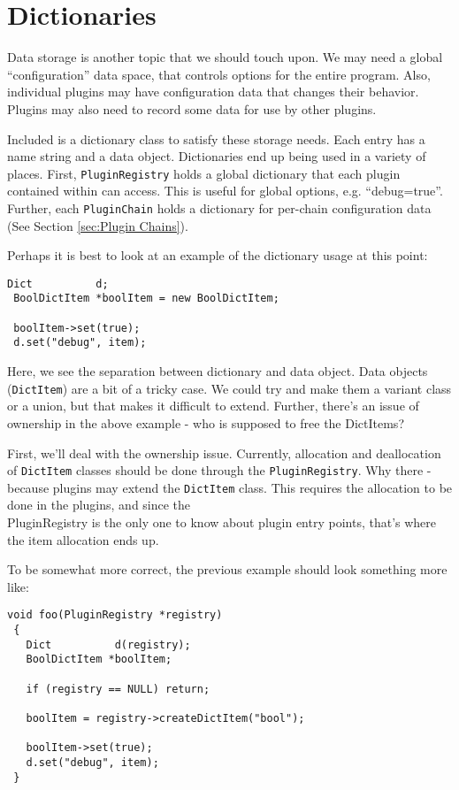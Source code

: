 
\section{Dictionaries}

Data storage is another topic that we should touch upon. We may 
need a global ``configuration'' data space, that controls options
for the entire program. Also, individual plugins may have configuration
data that changes their behavior. Plugins may also need to record 
some data for use by other plugins.

Included is a dictionary class to satisfy these storage needs. Each
entry has a name string and a data object. Dictionaries end up 
being used in a variety of places. First, {\tt PluginRegistry} 
holds a global dictionary that each plugin contained within can
access. This is useful for global options, e.g. ``debug=true''. Further,
each {\tt PluginChain} holds a dictionary for 
per-chain configuration data (See Section \ref{sec:Plugin Chains}).

Perhaps it is best to look at an example of the dictionary usage at this point:

\begin{lstlisting}[frame=single]
 Dict          d;
 BoolDictItem *boolItem = new BoolDictItem;

 boolItem->set(true);
 d.set("debug", item);
\end{lstlisting}

Here, we see the separation between dictionary and data object.
Data objects ({\tt DictItem}) are a bit of a tricky case. We could
try and make them a variant class or a union, but that makes it
difficult to extend. Further, there's an issue of ownership in
the above example - who is supposed to free the DictItems?

First, we'll deal with the ownership issue. Currently, allocation
and deallocation of {\tt DictItem} classes should be done through
the {\tt PluginRegistry}. Why there - because plugins may extend
the {\tt DictItem} class. This requires the allocation to be done
in the plugins, and since the {\\ PluginRegistry} is the only one 
to know about plugin entry points, that's where the item allocation
ends up.

To be somewhat more correct, the previous example should look
something more like:

\begin{lstlisting}[frame=single]
 void foo(PluginRegistry *registry) 
 {
   Dict          d(registry);
   BoolDictItem *boolItem;

   if (registry == NULL) return;

   boolItem = registry->createDictItem("bool");

   boolItem->set(true);
   d.set("debug", item);
 }
\end{lstlisting}

